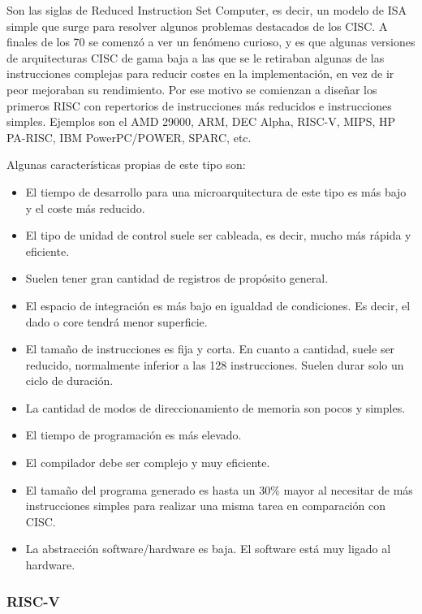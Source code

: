 \documentclass[a4paper, 11pt, titlepage]{article}
\begin{document}
        Son las siglas de Reduced Instruction Set Computer, es decir, un modelo de 
        ISA simple que surge para resolver algunos problemas destacados de los CISC. A finales de los 70 
        se comenzó a ver un fenómeno curioso, y es que algunas versiones de arquitecturas CISC de gama 
        baja a las que se le retiraban algunas de las instrucciones complejas para reducir costes en la 
        implementación, en vez de ir peor mejoraban su rendimiento. Por ese motivo se comienzan a diseñar 
        los primeros RISC con repertorios de instrucciones más reducidos e instrucciones simples. 
        Ejemplos son el AMD 29000, ARM, DEC Alpha, RISC-V, MIPS, HP PA-RISC, IBM PowerPC/POWER, SPARC, 
        etc.

        Algunas características propias de este tipo son:

        \begin{itemize}
            \item El tiempo de desarrollo para una microarquitectura de este tipo es más bajo y el coste más reducido.
            \item El tipo de unidad de control suele ser cableada, es decir, mucho más rápida y eficiente.
            \item Suelen tener gran cantidad de registros de propósito general.
            \item El espacio de integración es más bajo en igualdad de condiciones. Es decir, el dado o core tendrá 
            menor superficie.
            \item El tamaño de instrucciones es fija y corta. En cuanto a cantidad, suele ser reducido, normalmente 
            inferior a las 128 instrucciones. Suelen durar solo un ciclo de duración.
            \item La cantidad de modos de direccionamiento de memoria son pocos y simples.
            \item El tiempo de programación es más elevado.
            \item El compilador debe ser complejo y muy eficiente.
            \item El tamaño del programa generado es hasta un 30\% mayor al necesitar de más instrucciones 
            simples para realizar una misma tarea en comparación con CISC.
            \item La abstracción software/hardware es baja. El software está muy ligado al hardware.
        \end{itemize}

        \subsubsection{RISC-V}
\end{document}
